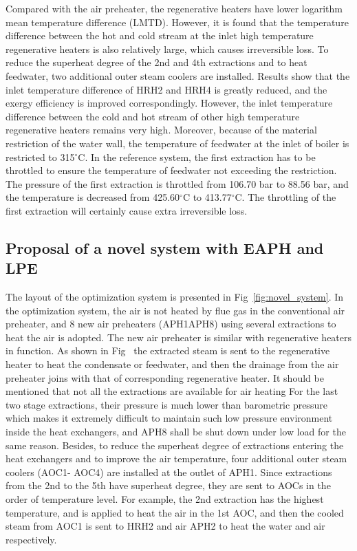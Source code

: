 \documentclass[preprint,12pt]{elsarticle}
\begin{document}
Compared with the air preheater, the regenerative heaters have lower logarithm mean temperature difference (LMTD).
However, it is found that the temperature difference between the hot and cold stream at the inlet high temperature regenerative heaters is also relatively large, which causes irreversible loss. To reduce the superheat degree of the 2nd and 4th extractions and to heat feedwater, two additional outer steam coolers are installed.
Results show that the inlet temperature difference of HRH2 and HRH4 is greatly reduced, and the exergy efficiency is improved correspondingly.
However, the inlet temperature difference between the cold and hot stream of other high temperature regenerative heaters remains very high.
Moreover, because of the material restriction of the water wall, the temperature of feedwater at the inlet of boiler is restricted to 315$^\circ$C. 
In the reference system, the first extraction has to be throttled to ensure the temperature of feedwater not exceeding the restriction.
The pressure of the first extraction is throttled from 106.70 bar to 88.56 bar, and the temperature is decreased from 425.60$^\circ$C to 413.77$^\circ$C. The throttling of the first extraction will certainly cause extra irreversible loss.
\subsection{Proposal of a novel system with EAPH and LPE}
\label{sub2:prop novel sys}

The  layout of the optimization system is presented in Fig~\ref{fig:novel_system}.
In the optimization system, the air is not heated by flue gas in the conventional air preheater, and 8 new air preheaters (APH1\-APH8) using several extractions to heat the air is adopted.
The new air preheater is similar with regenerative heaters in function.
As shown in Fig~ the extracted steam is sent to the regenerative heater to heat the condensate or feedwater, and then the drainage from the air preheater joins with that of corresponding regenerative heater.
It should be mentioned that not all the extractions are available for air heating
For the last two stage extractions, their pressure is much lower than barometric pressure which makes it extremely difficult to maintain such low pressure environment inside the heat exchangers, and APH8 shall be shut down under low load for the same reason.
Besides, to reduce the superheat degree of extractions entering the heat exchangers and to improve the air temperature, four additional outer steam coolers (AOC1- AOC4) are installed at the outlet of APH1.
Since extractions from the 2nd to the 5th have superheat degree, they are sent to AOCs in the order of temperature level.
For example, the 2nd extraction has the highest temperature, and is applied to heat the air in the 1st AOC, and then the cooled steam from AOC1 is sent to HRH2 and air APH2 to heat the water and air respectively.   
\end{document}
